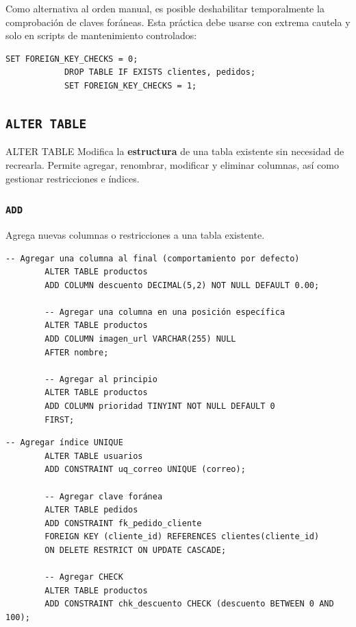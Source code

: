 \documentclass[12pt, a4paper]{article}
\begin{document}
	\begin{nota}
		Como alternativa al orden manual, es posible deshabilitar
		temporalmente la comprobación de claves foráneas. Esta práctica debe
		usarse con extrema cautela y solo en scripts de mantenimiento
		controlados:
		\begin{lstlisting}[style=sql, caption={Deshabilitar FK solo para scripts de mantenimiento}]
			SET FOREIGN_KEY_CHECKS = 0;
			DROP TABLE IF EXISTS clientes, pedidos;
			SET FOREIGN_KEY_CHECKS = 1;
		\end{lstlisting}
	\end{nota}
	
	\subsection{\texttt{ALTER TABLE}}
	
	\begin{definicion}{ALTER TABLE}
		Modifica la \textbf{estructura} de una tabla existente sin necesidad de
		recrearla. Permite agregar, renombrar, modificar y eliminar columnas, así
		como gestionar restricciones e índices.
	\end{definicion}
	
	\subsubsection{\texttt{ADD}}
	
	Agrega nuevas columnas o restricciones a una tabla existente.
	
	\begin{lstlisting}[style=sql, caption={ADD COLUMN — agregar columnas}]
		-- Agregar una columna al final (comportamiento por defecto)
		ALTER TABLE productos
		ADD COLUMN descuento DECIMAL(5,2) NOT NULL DEFAULT 0.00;
		
		-- Agregar una columna en una posición específica
		ALTER TABLE productos
		ADD COLUMN imagen_url VARCHAR(255) NULL
		AFTER nombre;
		
		-- Agregar al principio
		ALTER TABLE productos
		ADD COLUMN prioridad TINYINT NOT NULL DEFAULT 0
		FIRST;
	\end{lstlisting}
	
	\begin{lstlisting}[style=sql, caption={ADD CONSTRAINT — agregar restricciones}]
		-- Agregar índice UNIQUE
		ALTER TABLE usuarios
		ADD CONSTRAINT uq_correo UNIQUE (correo);
		
		-- Agregar clave foránea
		ALTER TABLE pedidos
		ADD CONSTRAINT fk_pedido_cliente
		FOREIGN KEY (cliente_id) REFERENCES clientes(cliente_id)
		ON DELETE RESTRICT ON UPDATE CASCADE;
		
		-- Agregar CHECK
		ALTER TABLE productos
		ADD CONSTRAINT chk_descuento CHECK (descuento BETWEEN 0 AND 100);
	\end{lstlisting}
	
\end{document}
